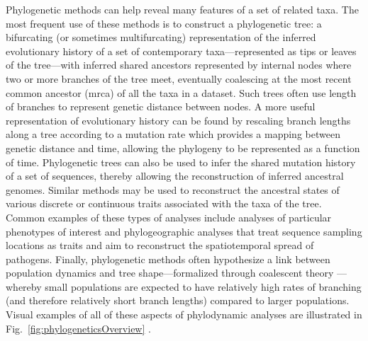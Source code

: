 Phylogenetic methods can help reveal many features of a set of related taxa.
The most frequent use of these methods is to construct a phylogenetic tree: a bifurcating (or sometimes multifurcating) representation of the inferred evolutionary history of a set of contemporary taxa---represented as tips or leaves of the tree---with inferred shared ancestors represented by internal nodes where two or more branches of the tree meet, eventually coalescing at the most recent common ancestor (\gls{mrca}) of all the taxa in a dataset.
Such trees often use length of branches to represent genetic distance between nodes.
A more useful representation of evolutionary history can be found by rescaling branch lengths along a tree according to a mutation rate which provides a mapping between genetic distance and time, allowing the phylogeny to be represented as a function of time.
Phylogenetic trees can also be used to infer the shared mutation history of a set of sequences, thereby allowing the reconstruction of inferred ancestral genomes.
Similar methods may be used to reconstruct the ancestral states of various discrete or continuous traits associated with the taxa of the tree.
Common examples of these types of analyses include analyses of particular phenotypes of interest and phylogeographic analyses that treat sequence sampling locations as traits and aim to reconstruct the spatiotemporal spread of pathogens.
Finally, phylogenetic methods often hypothesize a link between population dynamics and tree shape---formalized through coalescent theory \cite{Kingman1982}---whereby small populations are expected to have relatively high rates of branching (and therefore relatively short branch lengths) compared to larger populations.
Visual examples of all of these aspects of phylodynamic analyses are illustrated in Fig.~\ref{fig:phylogeneticsOverview} \cite{pybus2009evolutionary}.

